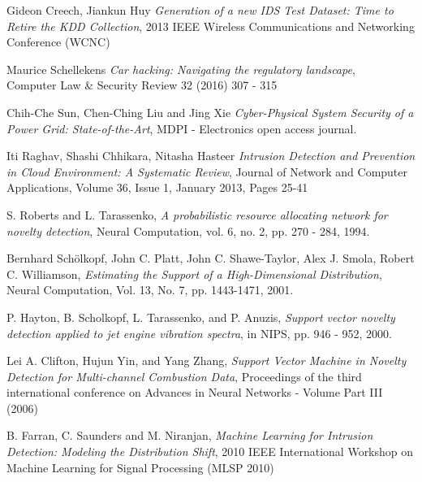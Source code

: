\documentclass[reqno,openany,12pt]{amsbook}
\begin{document}
 
\begin{thebibliography}{99}


 Gideon Creech, Jiankun Huy \emph{Generation of a new IDS Test Dataset: Time to Retire the KDD Collection}, 
2013 IEEE Wireless Communications and Networking Conference (WCNC)

 Maurice Schellekens \emph{Car hacking: Navigating the regulatory landscape},\\ Computer Law \& Security Review 32 (2016) 307 - 315

 Chih-Che Sun, Chen-Ching Liu and Jing Xie \emph{Cyber-Physical System Security of a Power Grid: State-of-the-Art}, MDPI - Electronics open access journal.

 Iti Raghav, Shashi Chhikara, Nitasha Hasteer \emph{Intrusion Detection and Prevention in Cloud Environment: A Systematic Review}, Journal of Network and Computer Applications, Volume 36, Issue 1, January 2013, Pages 25-41

 S. Roberts and L. Tarassenko, \emph{A probabilistic resource allocating
network for novelty detection}, Neural Computation, vol. 6, no. 2,
pp. 270 - 284, 1994.

 	Bernhard Schölkopf, John C. Platt, John C. Shawe-Taylor, Alex J. Smola, Robert C. Williamson, \emph{Estimating the Support of a High-Dimensional Distribution}, Neural Computation, Vol. 13, No. 7, pp. 1443-1471, 2001.

 P. Hayton, B. Scholkopf, L. Tarassenko, and P. Anuzis, \emph{Support vector novelty detection applied to jet engine vibration spectra}, in NIPS, pp. 946 - 952, 2000.

 Lei A. Clifton, Hujun Yin, and Yang Zhang, \emph{Support Vector Machine in Novelty Detection for Multi-channel Combustion Data}, Proceedings of the third international conference on Advances in Neural Networks - Volume Part III (2006)

 B. Farran, C. Saunders and M. Niranjan, \emph{Machine Learning for Intrusion Detection: Modeling the Distribution Shift}, 2010 IEEE International Workshop on Machine Learning for Signal Processing (MLSP 2010)






\end{thebibliography}
\end{document}
